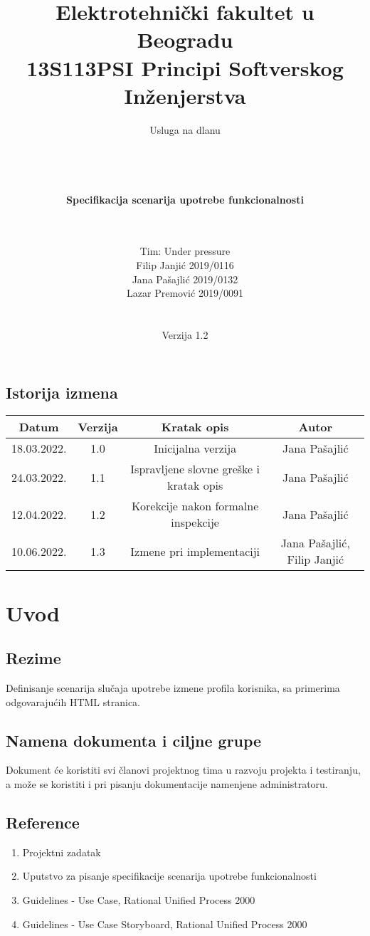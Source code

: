 \documentclass[a4paper,12pt]{report}
\title{\Large Elektrotehnički fakultet u Beogradu \\ 13S113PSI Principi Softverskog Inženjerstva}
\author{\Huge Usluga na dlanu\\ \ \\ \ \\ \ \\ \ \\
	\Large \textbf{Specifikacija scenarija upotrebe funkcionalnosti}\\\Large \textbf{\genitivfunkcionalnosti} \\ \ \\}
\date{\Large   Tim: Under pressure \\ Filip Janjić 2019/0116 \\ Jana Pašajlić 2019/0132 \\ Lazar Premović 2019/0091  \\ \  \\ \  \\\large Verzija 1.2}
\newcommand{\inicijalniautor}{Jana Pašajlić}
\newcommand{\inicijalnidatum}{18.03.2022.}
\begin{document}
\maketitle

\begin{center}
\section*{Istorija izmena}
\begin{tabular}{ |c|c|c|c| }
\hline
\textbf{Datum} & \textbf{Verzija} & \textbf{Kratak opis} & \textbf{Autor} \\ 
\hline
 \inicijalnidatum & 1.0  & Inicijalna verzija & \inicijalniautor \\
 \hline
 24.03.2022. & 1.1  & Ispravljene slovne greške i kratak opis & \inicijalniautor  \\
 \hline
 12.04.2022. & 1.2  & Korekcije nakon formalne inspekcije & \inicijalniautor  \\
 \hline
 10.06.2022. & 1.3 & Izmene pri implementaciji & Jana Pašajlić, Filip Janjić \\
 \hline
\end{tabular}
\end{center}
\newpage

\tableofcontents

\newpage
\section{Uvod}
\subsection{Rezime}
    Definisanje scenarija slučaja upotrebe izmene profila korisnika, sa primerima odgovarajućih HTML stranica.
\subsection{Namena dokumenta i ciljne grupe}
    Dokument će koristiti svi članovi projektnog tima u razvoju projekta i testiranju, a može se koristiti i pri pisanju dokumentacije namenjene administratoru.
\subsection{Reference}
 \begin{enumerate}
    \item Projektni zadatak
    \item Uputstvo za pisanje specifikacije scenarija upotrebe funkcionalnosti 
    \item Guidelines - Use Case, Rational Unified Process 2000
    \item Guidelines - Use Case Storyboard, Rational Unified Process 2000
 \end{enumerate}
\end{document}
